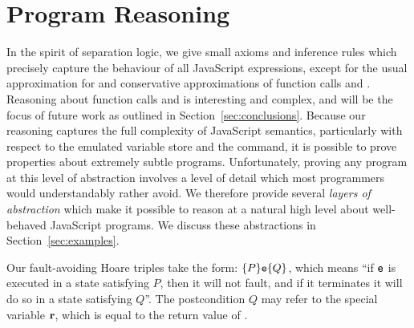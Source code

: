 \documentclass{article}
\begin{document}
\section{Program Reasoning}\label{sec:reasoning}
%

In the spirit of separation logic, we give 
small axioms and inference rules which precisely capture the behaviour
of all JavaScript expressions,  except for the usual approximation for
  and conservative approximations of function calls and
. Reasoning about function calls and  is interesting and complex, and will be the
focus of future work as outlined in Section~\ref{sec:conclusions}.
Because our reasoning captures the full complexity of JavaScript
semantics, particularly with respect to the emulated variable store
and the  command, it is possible to prove properties about extremely subtle
programs. Unfortunately, proving any program at this
level of abstraction involves a level  of  detail which most programmers
would understandably rather avoid. We therefore provide several
\emph{layers of abstraction} which make it possible to reason at a
natural high level about well-behaved JavaScript programs.
We discuss these abstractions  in Section~\ref{sec:examples}.

Our fault-avoiding Hoare triples take the form:
$\{P\}\mbox{\texttt{{\upshape e}}}\{Q\}$, which means ``if $\mbox{\texttt{{\upshape e}}}$ is executed
in a state satisfying $P$, then it will not fault, and if it
terminates it will do so in a state satisfying $Q$''. The postcondition $Q$ may
refer to the special variable ${\mathrm{\textbf{r}}}$, which is equal to the return value of
.  
\end{document}
